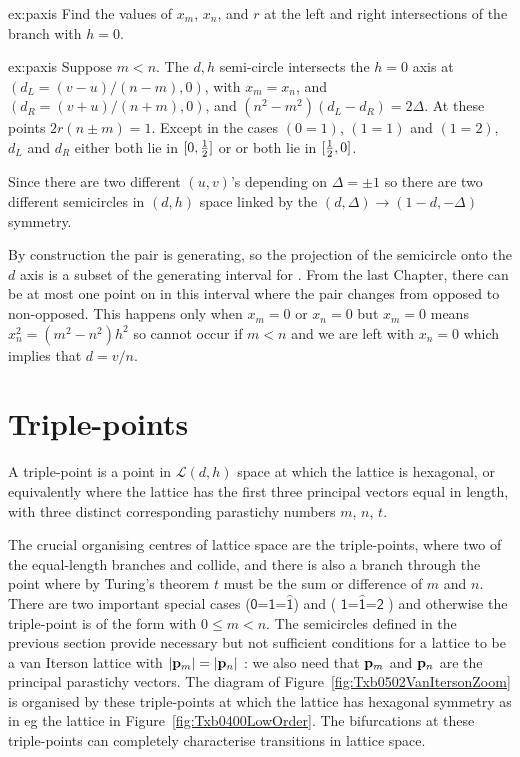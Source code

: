 \begin{jExercise}{ex:paxis}
	Find the values of $x_m$, $x_n$, and $r$ at the left and right
	intersections of the  branch with $h=0$.
	
\end{jExercise}
\begin{jAnswer}{ex:paxis}
	Suppose $m<n$. The $d,h$ semi-circle intersects the $h=0$ axis 
	at $(d_L= (v-u)/(n-m),0)$, with $x_m=x_n$, and $(d_R=(v+u)/(n+m),0)$, 
	and $(n^2-m^2)(d_L-d_R) = 2\Delta$. 
	At these points $2r(n\pm m)=1$.
Except in the cases $(0=1)$, $(1=1)$ and $(1=2)$,  $d_L$ and $d_R$ either both lie in $[0,\textstyle{\frac{1}{2}}]$ or or both lie in $[\textstyle{\frac{1}{2}},0]$.
\end{jAnswer}



Since there are two different $(u,v)$'s depending on $\Delta=\pm 1$ so there are two different semicircles in $(d,h)$ space linked by the $(d,\Delta)\rightarrow(1-d,-\Delta)$ symmetry.

By construction the pair is generating, so the projection of the semicircle onto the $d$ axis is a subset of the generating interval for . From the last Chapter, there can be at most one point on in this interval where the pair changes from opposed to non-opposed. This happens only when $x_m=0$ or $x_n=0$ but
$x_m=0$ means $x_n^2=(m^2-n^2)h^2$ so cannot occur if $m<n$  and we are left with $x_n=0$ which implies that $d=v/n$. 


\section{Triple-points}
\label{sec:triplep}
\begin{definition}
	A {triple-point}  is a point in $\mathcal{L}(d,h)$ space at which the lattice is hexagonal, or equivalently where the lattice has the first three  principal vectors equal in length, with three distinct corresponding parastichy numbers $m$, $n$, $t$. 
\end{definition}
The crucial organising centres of lattice space are the triple-points, where two of the equal-length branches  and  collide, and there is also a branch  through the point where by Turing's theorem $t$ must be the sum or difference of $m$ and $n$. There are two important special cases
\textsf{	 (\ensuremath{\textsf{0=1=}\hat{\textsf{1}}})}
  and 
\textsf{   (
\ensuremath{ 
	\textsf{1=}
	\hat{\textsf{1}}
	\textsf{=2}}
)}
and otherwise the  triple-point is of the form  with $0\leq m<n$. 
The semicircles defined in the previous section provide necessary but not sufficient conditions for a lattice to be a van Iterson lattice with $|{\mathbf p}_{m}|=|{\mathbf p}_{n}|$ : we also need that ${\mathbf p}_{m}$ and ${\mathbf p}_{n}$ are the principal parastichy vectors. 
The diagram of  Figure~\ref{fig:Txb0502VanItersonZoom} is organised by these triple-points  at which the lattice has hexagonal symmetry as in eg the  lattice in Figure~\ref{fig:Txb0400LowOrder}. The bifurcations at these triple-points can completely characterise transitions in lattice space.

